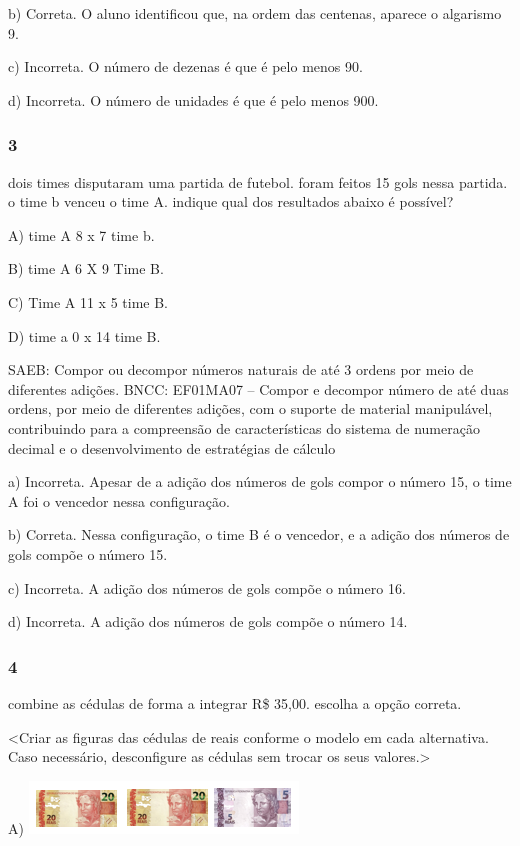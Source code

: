 \begin{itemize}
\begin{itemize}
b) Correta. O aluno identificou que, na ordem das centenas, aparece o
algarismo 9.

c) Incorreta. O número de dezenas é que é pelo menos 90.

d) Incorreta. O número de unidades é que é pelo menos 900.

\subsubsection{3}\label{section-119}

dois times disputaram uma partida de futebol. foram feitos 15 gols nessa
partida. o time b venceu o time A. indique qual dos resultados abaixo é
possível?

A) time A 8 x 7 time b.

B) time A 6 X 9 Time B.

C) Time A 11 x 5 time B.

D) time a 0 x 14 time B.

SAEB: Compor ou decompor números naturais de até 3 ordens por
meio de diferentes adições.
BNCC: EF01MA07 -- Compor e decompor número de até duas ordens, por meio
de diferentes adições, com o suporte de material manipulável,
contribuindo para a compreensão de características do sistema de
numeração decimal e o desenvolvimento de estratégias de cálculo

a) Incorreta. Apesar de a adição dos números de gols compor o número 15, o time A foi o vencedor nessa configuração.

b) Correta. Nessa configuração, o time B é o vencedor, e a adição dos números de gols compõe o número 15.

c) Incorreta. A adição dos números de gols compõe o número 16.

d) Incorreta. A adição dos números de gols compõe o número 14.

\subsubsection{4}\label{section-120}

combine as cédulas de forma a integrar R\$ 35,00. escolha a opção
correta.

\textless{}Criar as figuras das cédulas de reais conforme o modelo em
cada alternativa. Caso necessário, desconfigure as cédulas sem trocar os
seus valores.\textgreater{}

A)
\includegraphics[width=2.81289in,height=0.55216in]{media/image140.png}


\end{itemize}
\end{itemize}
